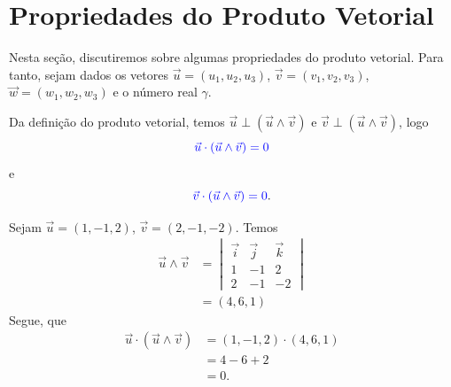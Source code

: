 \section{Propriedades do Produto Vetorial}\label{cap_prodvet_sec_prop}
\badgeRevisar

Nesta seção, discutiremos sobre algumas propriedades do produto vetorial. Para tanto, sejam dados os vetores $\vec{u} = (u_1,u_2,u_3)$, $\vec{v}=(v_1,v_2,v_3)$, $\vec{w}=(w_1,w_2,w_3)$ e o número real $\gamma$.

Da definição do produto vetorial, temos $\vec{u}\perp(\vec{u}\land\vec{v})$ e $\vec{v}\perp(\vec{u}\land\vec{v})$, logo
\begin{equation}
  {\color{blue}\vec{u}\cdot(\vec{u}\land\vec{v}) = 0}
\end{equation}
e
\begin{equation}
  {\color{blue}\vec{v}\cdot(\vec{u}\land\vec{v}) = 0}.
\end{equation}

\begin{ex}
  Sejam $\vec{u}=(1,-1,2)$, $\vec{v}=(2,-1,-2)$. Temos
  \begin{align}
    \vec{u}\land\vec{v} &=
    \begin{vmatrix}
      \vec{i} & \vec{j} & \vec{k} \\
      1 & -1 & 2 \\
      2 & -1 & -2
    \end{vmatrix}\\
              &= (4,6,1)
  \end{align}
  Segue, que
  \begin{align}
    \vec{u}\cdot(\vec{u}\land\vec{v}) &= (1,-1,2)\cdot (4,6,1) \\
                                      &= 4-6+2\\
                                      &= 0.
  \end{align}
\end{ex}


